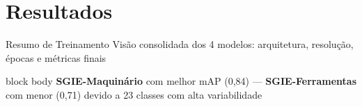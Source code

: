 
\section{Resultados}

\begin{frame}{Resumo de Treinamento}
  \vspace{-2mm}
  {\small\color{sublabelcolor}%
    Vis\~{a}o consolidada dos 4 modelos: arquitetura, resolu\c{c}\~{a}o, \'{e}pocas e m\'{e}tricas finais}

  \vfill
  \begin{center}
    \resizebox{0.95\textwidth}{!}{}
  \end{center}
  \vfill

  \begin{beamercolorbox}[wd=\textwidth, rounded=true, shadow=false]{block body}
    \centering
    {\footnotesize\color{stagecolor}%
      \textbf{SGIE-Maquin\'{a}rio} com melhor mAP (0,84) --- \textbf{SGIE-Ferramentas} com menor (0,71) devido a 23 classes com alta variabilidade}
  \end{beamercolorbox}
\end{frame}

